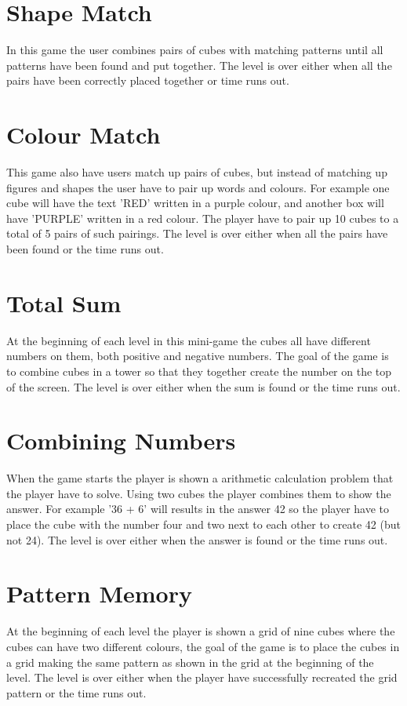 \section{Shape Match}
\label{game:shape_match} 
In this game the user combines pairs of cubes with matching patterns until all patterns have been found and put together.
The level is over either when all the pairs have been correctly placed together or time runs out.

\section{Colour Match}
\label{game:colour_match}
This game also have users match up pairs of cubes, but instead of matching up figures and shapes the user have to pair up words and colours. For example one cube will have the text 'RED' written in a purple colour, and another box will have 'PURPLE' written in a red colour. The player have to pair up 10 cubes to a total of 5 pairs of such pairings.
The level is over either when all the pairs have been found or the time runs out.

\section{Total Sum}
\label{game:total_sum}
At the beginning of each level in this mini-game the cubes all have different numbers on them, both positive and negative numbers. The goal of the game is to combine cubes in a tower so that they together create the number on the top of the screen.
The level is over either when the sum is found or the time runs out.

\section{Combining Numbers}
\label{game:combining_numbers}
When the game starts the player is shown a arithmetic calculation problem that the player have to solve. Using two cubes the player combines them to show the answer. For example '36 + 6' will results in the answer 42 so the player have to place the cube with the number four and two next to each other to create 42 (but not 24).
The level is over either when the answer is found or the time runs out.

\section{Pattern Memory}
\label{game:pattern_memory}
At the beginning of each level the player is shown a grid of nine cubes where the cubes can have two different colours, the goal of the game is to place the cubes in a grid making the same pattern as shown in the grid at the beginning of the level. The level is over either when the player have successfully recreated the grid pattern or the time runs out.

